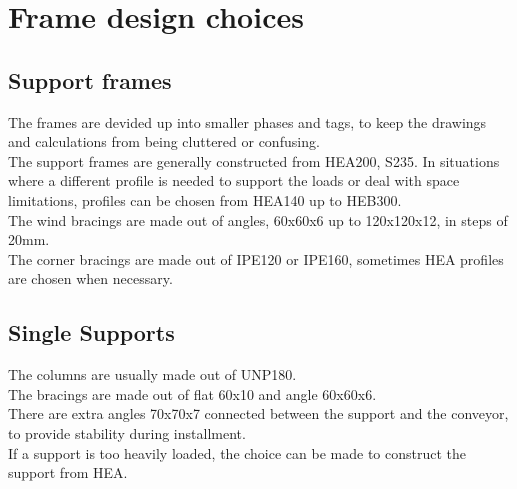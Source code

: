 \section{Frame design choices}

\subsection{Support frames}
The frames are devided up into smaller phases and tags, to keep the drawings and calculations from being cluttered or confusing.\\
The support frames are generally constructed from HEA200, S235. In situations where a different profile is needed to support the loads or deal with space limitations, profiles can be chosen from HEA140 up to HEB300.\\
The wind bracings are made out of angles, 60x60x6 up to 120x120x12, in steps of 20mm.\\
The corner bracings are made out of IPE120 or IPE160, sometimes HEA profiles are chosen when necessary.\\

\subsection{Single Supports}
The columns are usually made out of UNP180.\\
The bracings are made out of flat 60x10 and angle 60x60x6.\\
There are extra angles 70x70x7 connected between the support and the conveyor, to provide stability during installment.\\
If a support is too heavily loaded, the choice can be made to construct the support from HEA.\\
